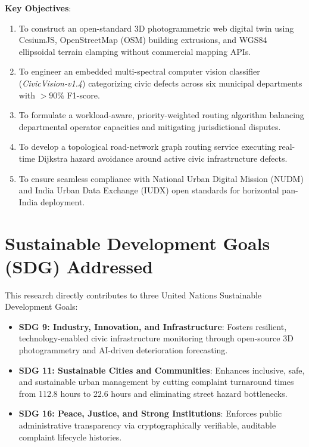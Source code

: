 \documentclass[12pt,a4paper]{report}
\begin{document}
\textbf{Key Objectives}:
\begin{enumerate}[label=\arabic*.]
    \item To construct an open-standard 3D photogrammetric web digital twin using CesiumJS, OpenStreetMap (OSM) building extrusions, and WGS84 ellipsoidal terrain clamping without commercial mapping APIs.
    \item To engineer an embedded multi-spectral computer vision classifier (\textit{CivicVision-v1.4}) categorizing civic defects across six municipal departments with $>90\%$ F1-score.
    \item To formulate a workload-aware, priority-weighted routing algorithm balancing departmental operator capacities and mitigating jurisdictional disputes.
    \item To develop a topological road-network graph routing service executing real-time Dijkstra hazard avoidance around active civic infrastructure defects.
    \item To ensure seamless compliance with National Urban Digital Mission (NUDM) and India Urban Data Exchange (IUDX) open standards for horizontal pan-India deployment.
\end{enumerate}

\section{Sustainable Development Goals (SDG) Addressed}
This research directly contributes to three United Nations Sustainable Development Goals:
\begin{itemize}
    \item \textbf{SDG 9: Industry, Innovation, and Infrastructure}: Fosters resilient, technology-enabled civic infrastructure monitoring through open-source 3D photogrammetry and AI-driven deterioration forecasting.
    \item \textbf{SDG 11: Sustainable Cities and Communities}: Enhances inclusive, safe, and sustainable urban management by cutting complaint turnaround times from 112.8 hours to 22.6 hours and eliminating street hazard bottlenecks.
    \item \textbf{SDG 16: Peace, Justice, and Strong Institutions}: Enforces public administrative transparency via cryptographically verifiable, auditable complaint lifecycle histories.
\end{itemize}

\newpage
\end{document}
